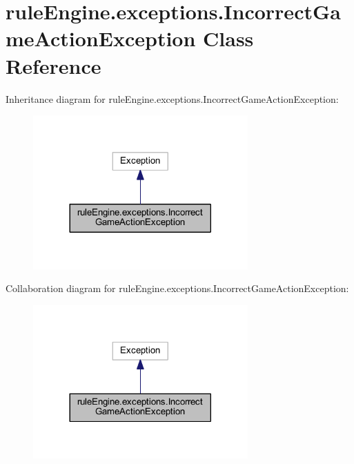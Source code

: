 \hypertarget{classrule_engine_1_1exceptions_1_1_incorrect_game_action_exception}{}\section{rule\+Engine.\+exceptions.\+Incorrect\+Game\+Action\+Exception Class Reference}
\label{classrule_engine_1_1exceptions_1_1_incorrect_game_action_exception}


Inheritance diagram for rule\+Engine.\+exceptions.\+Incorrect\+Game\+Action\+Exception\+:
\nopagebreak
\begin{figure}[H]
\begin{center}
\leavevmode
\includegraphics[width=233pt]{classrule_engine_1_1exceptions_1_1_incorrect_game_action_exception__inherit__graph}
\end{center}
\end{figure}


Collaboration diagram for rule\+Engine.\+exceptions.\+Incorrect\+Game\+Action\+Exception\+:
\nopagebreak
\begin{figure}[H]
\begin{center}
\leavevmode
\includegraphics[width=233pt]{classrule_engine_1_1exceptions_1_1_incorrect_game_action_exception__coll__graph}
\end{center}
\end{figure}
